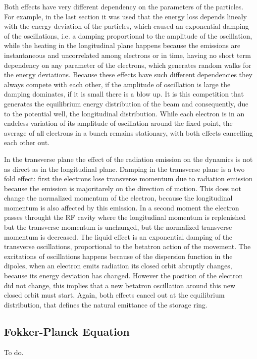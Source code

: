 \documentclass[
	12pt,				%
	openright,			%
	oneside,			%
	a4paper,		%
	chapter=TITLE,		%
	section=TITLE,		%
    brazil,				%
	english,			%
	sumario=tradicional,
	]{abntex2}
\begin{document}
  Both effects have very different dependency on the parameters of the particles. For example, in the last section it was used that the energy loss depends linealy with the energy deviation of the particles, which caused an exponential damping of the oscillations, i.e. a damping proportional to the amplitude of the oscillation, while the heating in the longitudinal plane happens because the emissions are instantaneous and uncorrelated among electrons or in time, having no short term dependency on any parameter of the electrons, which generates random walks for the energy deviations. Because these effects have such different dependencies they always compete with each other, if the amplitude of oscillation is large the damping dominates, if it is small there is a blow up. It is this competition that generates the equilibrium energy distribution of the beam and consequently, due to the potential well, the longitudinal distribution. While each electron is in an endeless variation of its amplitude of oscillation around the fixed point, the average of all electrons in a bunch remains stationary, with both effects cancelling each other out.

  In the transverse plane the effect of the radiation emission on the dynamics is not as direct as in the longitudinal plane. Damping in the transverse plane is a two fold effect: first the electrons lose transverse momentum due to radiation emission because the emission is majoritarely on the direction of motion. This does not change the normalized momentum of the electron, because the longitudinal momentum is also affected by this emission. In a second moment the electron passes throught the RF cavity where the longitudinal momentum is replenished but the transverse momentum is unchanged, but the normalized transverse momentum is decreased. The liquid effect is an exponential damping of the transverse oscillations, proportional to the betatron action of the movement. The excitations of oscillations happens because of the dispersion function in the dipoles, when an electron emits radiation its closed orbit abruptly changes, because its energy deviation has changed. However the position of the electron did not change, this implies that a new betatron oscillation around this new closed orbit must start. Again, both effects cancel out at the equilibrium distribution, that defines the natural emittance of the storage ring.

    \subsection{Fokker-Planck Equation}
	To do.
\end{document}
